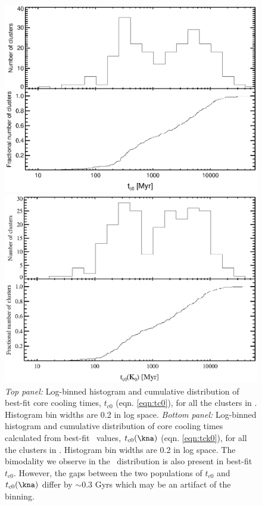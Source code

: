 \begin{figure}[htp]
  \begin{center}
    \begin{minipage}[htp]{0.8\linewidth}
      \includegraphics*[width=\textwidth, trim=20mm 10mm 10mm 10mm, clip]{t0.eps}
    \end{minipage}
    \begin{minipage}[htp]{0.8\linewidth}
      \includegraphics*[width=\textwidth, trim=20mm 10mm 10mm 10mm, clip]{k0cool.eps}
    \end{minipage}
    \caption[Histograms of best-fit core cooling times.]{{\it{Top panel:}} Log-binned histogram and cumulative
      distribution of best-fit core cooling times, $t_{c0}$
      (eqn. \ref{eqn:tc0}), for all the clusters in \accept. Histogram
      bin widths are 0.2 in log space. {\it{Bottom panel:}} Log-binned
      histogram and cumulative distribution of core cooling times
      calculated from best-fit \kna\ values, $t_{c0}(\kna)$
      (eqn. \ref{eqn:tck0}), for all the clusters in
      \accept. Histogram bin widths are 0.2 in log space. The
      bimodality we observe in the \kna\ distribution is also present
      in best-fit $t_{c0}$. However, the gaps between the two
      populations of $t_{c0}$ and $t_{c0}(\kna)$ differ by $\sim 0.3$
      Gyrs which may be an artifact of the binning.}
    \label{fig:t0}
  \end{center}
\end{figure}

